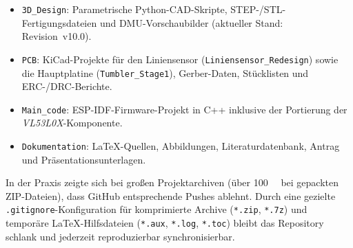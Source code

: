 \begin{itemize}
  \item \texttt{3D\_Design}: Parametrische Python-CAD-Skripte, STEP-/STL-Fertigungsdateien und DMU-Vorschaubilder (aktueller Stand: Revision~v10.0).
  \item \texttt{PCB}: KiCad-Projekte für den Liniensensor (\texttt{Liniensensor\_Redesign}) sowie die Hauptplatine (\texttt{Tumbler\_Stage1}), Gerber-Daten, Stücklisten und ERC-/DRC-Berichte.
  \item \texttt{Main\_code}: ESP-IDF-Firmware-Projekt in C++ inklusive der Portierung der \emph{VL53L0X}-Komponente.
  \item \texttt{Dokumentation}: LaTeX-Quellen, Abbildungen, Literaturdatenbank, Antrag und Präsentationsunterlagen.
\end{itemize}

In der Praxis zeigte sich bei großen Projektarchiven (über \qty{100}{\mebi\byte} bei gepackten ZIP-Dateien), dass GitHub entsprechende Pushes ablehnt. Durch eine gezielte \texttt{.gitignore}-Konfiguration für komprimierte Archive (\texttt{*.zip}, \texttt{*.7z}) und temporäre LaTeX-Hilfsdateien (\texttt{*.aux}, \texttt{*.log}, \texttt{*.toc}) bleibt das Repository schlank und jederzeit reproduzierbar synchronisierbar.
